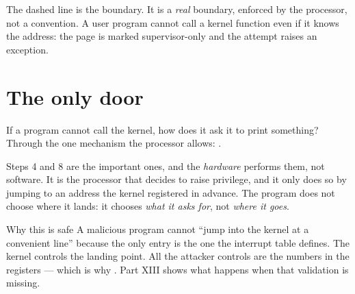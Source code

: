 The dashed line is the boundary. It is a \emph{real} boundary, enforced by the processor, not a
convention. A user program cannot call a kernel function even if it knows the address: the page is
marked supervisor-only and the attempt raises an exception.

\section{The only door}

If a program cannot call the kernel, how does it ask it to print something? Through the one
mechanism the processor allows: .

\begin{center}
\end{center}

Steps 4 and 8 are the important ones, and the \emph{hardware} performs them, not software. It is
the processor that decides to raise privilege, and it only does so by jumping to an address the
kernel registered in advance. The program does not choose where it lands: it chooses \emph{what it
asks for}, not \emph{where it goes}.

\begin{concept}{Why this is safe}
A malicious program cannot ``jump into the kernel at a convenient line'' because the only entry is
the one the interrupt table defines. The kernel controls the landing point. All the attacker
controls are the numbers in the registers --- which is why . Part XIII shows what happens when
that validation is missing.
\end{concept}

